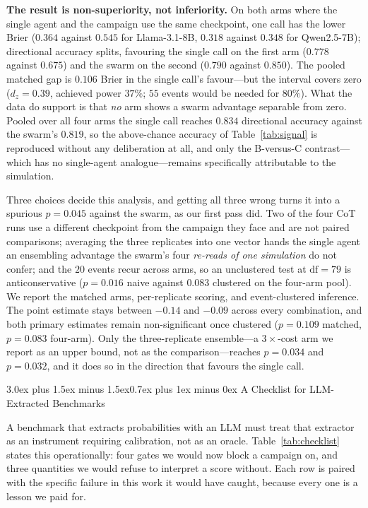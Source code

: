 \documentclass[10pt,conference]{IEEEtran}
\makeatletter
\renewcommand\section{\@startsection{section}{1}{\z@}%
  {3.0ex plus 1.5ex minus 1.5ex}{0.7ex plus 1ex minus 0ex}%
  {\normalfont\normalsize\centering\bfseries}}
\makeatother
\begin{document}
\textbf{The result is non-superiority, not inferiority.} On both arms where the single agent and the campaign use the same checkpoint, one call has the lower Brier ($0.364$ against $0.545$ for Llama-3.1-8B, $0.318$ against $0.348$ for Qwen2.5-7B); directional accuracy splits, favouring the single call on the first arm ($0.778$ against $0.675$) and the swarm on the second ($0.790$ against $0.850$). The pooled matched gap is $0.106$ Brier in the single call's favour---but the interval covers zero ($d_z = 0.39$, achieved power $37\%$; $55$ events would be needed for $80\%$). What the data do support is that \emph{no} arm shows a swarm advantage separable from zero. Pooled over all four arms the single call reaches $0.834$ directional accuracy against the swarm's $0.819$, so the above-chance accuracy of Table~\ref{tab:signal} is reproduced without any deliberation at all, and only the B-versus-C contrast---which has no single-agent analogue---remains specifically attributable to the simulation.

Three choices decide this analysis, and getting all three wrong turns it into a spurious $p = 0.045$ against the swarm, as our first pass did. Two of the four CoT runs use a different checkpoint from the campaign they face and are not paired comparisons; averaging the three replicates into one vector hands the single agent an ensembling advantage the swarm's four \emph{re-reads of one simulation} do not confer; and the $20$ events recur across arms, so an unclustered test at $\mathrm{df}=79$ is anticonservative ($p = 0.016$ naive against $0.083$ clustered on the four-arm pool). We report the matched arms, per-replicate scoring, and event-clustered inference. The point estimate stays between $-0.14$ and $-0.09$ across every combination, and both primary estimates remain non-significant once clustered ($p = 0.109$ matched, $p = 0.083$ four-arm). Only the three-replicate ensemble---a $3\times$-cost arm we report as an upper bound, not as the comparison---reaches $p = 0.034$ and $p = 0.032$, and it does so in the direction that favours the single call.

\section{A Checklist for LLM-Extracted Benchmarks}
\label{sec:checklist}

A benchmark that extracts probabilities with an LLM must treat that extractor as an instrument requiring calibration, not as an oracle. Table~\ref{tab:checklist} states this operationally: four gates we would now block a campaign on, and three quantities we would refuse to interpret a score without. Each row is paired with the specific failure in this work it would have caught, because every one is a lesson we paid for.
\end{document}
